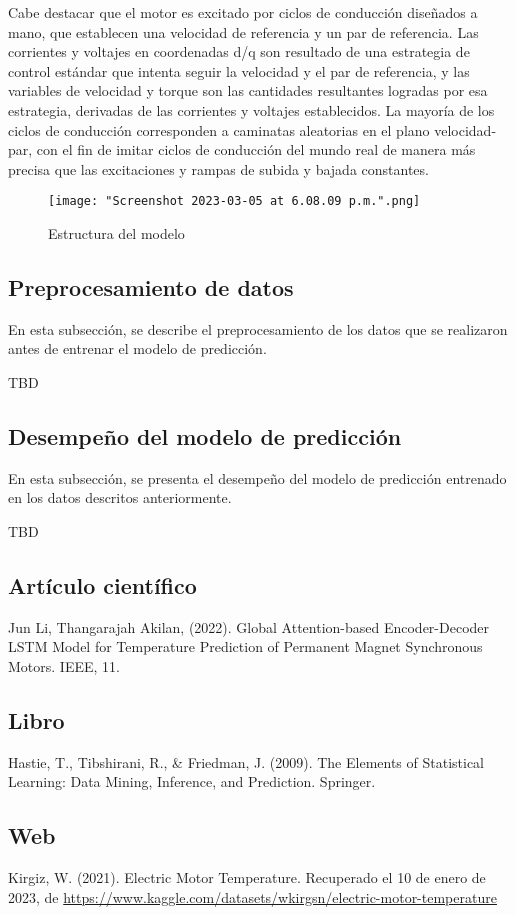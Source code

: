 \documentclass{article}
\begin{document}
Cabe destacar que el motor es excitado por ciclos de conducción diseñados a mano, que establecen una velocidad de referencia y un par de referencia. Las corrientes y voltajes en coordenadas d/q son resultado de una estrategia de control estándar que intenta seguir la velocidad y el par de referencia, y las variables de velocidad y torque son las cantidades resultantes logradas por esa estrategia, derivadas de las corrientes y voltajes establecidos. La mayoría de los ciclos de conducción corresponden a caminatas aleatorias en el plano velocidad-par, con el fin de imitar ciclos de conducción del mundo real de manera más precisa que las excitaciones y rampas de subida y bajada constantes.

\begin{figure}[htbp]
\centering
\caption{Estructura del modelo}
\texttt{[image: "Screenshot 2023-03-05 at 6.08.09 p.m.".png]}
\end{figure}


\subsection{Preprocesamiento de datos}

En esta subsección, se describe el preprocesamiento de los datos que se realizaron antes de entrenar el modelo de predicción.

TBD

\subsection{Desempeño del modelo de predicción}

En esta subsección, se presenta el desempeño del modelo de predicción entrenado en los datos descritos anteriormente.

TBD

\pagebreak







\subsection{Artículo científico}

 Jun Li, Thangarajah Akilan, (2022). Global Attention-based Encoder-Decoder LSTM Model for Temperature Prediction of Permanent Magnet Synchronous Motors. IEEE, 11.

\subsection{Libro}

 Hastie, T., Tibshirani, R., & Friedman, J. (2009). The Elements of Statistical Learning: Data Mining, Inference, and Prediction. Springer.

\subsection{Web}
Kirgiz, W. (2021). Electric Motor Temperature. Recuperado el 10 de enero de 2023, de \url{https://www.kaggle.com/datasets/wkirgsn/electric-motor-temperature}
\end{document}
